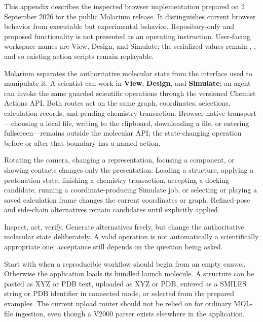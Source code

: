 \documentclass[11pt]{article}
\begin{document}
This appendix describes the inspected browser implementation prepared on 2 September 2026 for the public Molarium release. It distinguishes current browser behavior from executable but experimental behavior. Repository-only and proposed functionality is not presented as an operating instruction. User-facing workspace names are View, Design, and Simulate; the serialized values remain , , and  so existing action scripts remain replayable.


Molarium separates the authoritative molecular state from the interface used to manipulate it. A scientist can work in \textbf{View}, \textbf{Design}, and \textbf{Simulate}; an agent can invoke the same guarded scientific operations through the versioned Chemist Actions API. Both routes act on the same graph, coordinates, selections, calculation records, and pending chemistry transaction. Browser-native transport---choosing a local file, writing to the clipboard, downloading a file, or entering fullscreen---remains outside the molecular API; the state-changing operation before or after that boundary has a named action.

Rotating the camera, changing a representation, focusing a component, or showing contacts changes only the presentation. Loading a structure, applying a protonation state, finishing a chemistry transaction, accepting a docking candidate, running a coordinate-producing Simulate job, or selecting or playing a saved calculation frame changes the current coordinates or graph. Refined-pose and side-chain alternatives remain candidates until explicitly applied.

Inspect, act, verify. Generate alternatives freely, but change the authoritative molecular state deliberately. A valid operation is not automatically a scientifically appropriate one; acceptance still depends on the question being asked.


Start with  when a reproducible workflow should begin from an empty canvas. Otherwise the application loads its bundled launch molecule. A structure can be pasted as XYZ or PDB text, uploaded as XYZ or PDB, entered as a SMILES string or PDB identifier in connected mode, or selected from the prepared examples. The current upload router should not be relied on for ordinary MOL-file ingestion, even though a V2000 parser exists elsewhere in the application.
\end{document}
